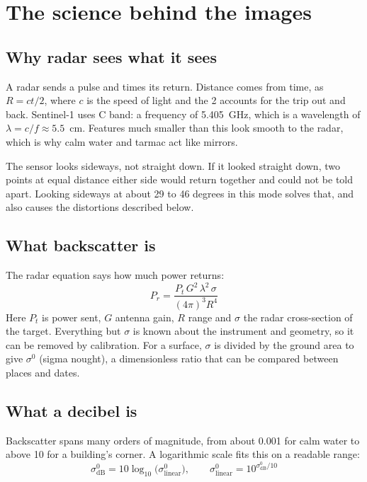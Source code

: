 \chapter{The science behind the images}\label{sec:science}

\section{Why radar sees what it sees}
A radar sends a pulse and times its return. Distance comes from time, as $R = ct/2$, where $c$ is the speed of light and the 2 accounts for the trip out and back. Sentinel-1 uses C band: a frequency of 5.405~GHz, which is a wavelength of $\lambda = c/f \approx 5.5$~cm. Features much smaller than this look smooth to the radar, which is why calm water and tarmac act like mirrors.

The sensor looks sideways, not straight down. If it looked straight down, two points at equal distance either side would return together and could not be told apart. Looking sideways at about 29 to 46 degrees in this mode solves that, and also causes the distortions described below.

\section{What backscatter is}
The radar equation says how much power returns:
\begin{equation}
P_r = \frac{P_t\, G^2\, \lambda^2\, \sigma}{(4\pi)^3 R^4}
\end{equation}
Here $P_t$ is power sent, $G$ antenna gain, $R$ range and $\sigma$ the radar cross-section of the target. Everything but $\sigma$ is known about the instrument and geometry, so it can be removed by calibration. For a surface, $\sigma$ is divided by the ground area to give $\sigma^0$ (sigma nought), a dimensionless ratio that can be compared between places and dates.

\section{What a decibel is}
Backscatter spans many orders of magnitude, from about 0.001 for calm water to above 10 for a building's corner. A logarithmic scale fits this on a readable range:
\begin{equation}
\sigma^0_{\mathrm{dB}} = 10\log_{10}\bigl(\sigma^0_{\mathrm{linear}}\bigr), \qquad \sigma^0_{\mathrm{linear}} = 10^{\sigma^0_{\mathrm{dB}}/10}
\end{equation}

